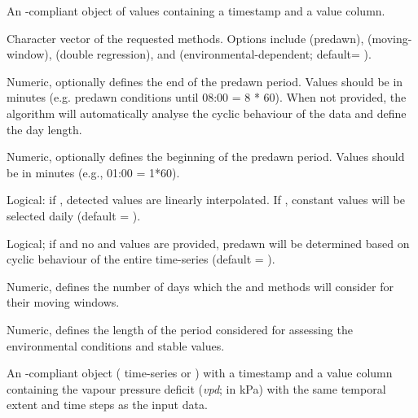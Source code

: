 \documentclass[a4paper]{book}
\begin{document}
\begin{Arguments}
\begin{ldescription}
\item[\code{input}] An -compliant object of  values containing
a timestamp and a value column.

\item[\code{methods}] Character vector of the requested  methods.
Options include  (predawn),  (moving-window),  (double regression),
and  (environmental-dependent; default= ).

\item[\code{zero.end}] Numeric, optionally defines the end of the predawn period.
Values should be in minutes (e.g. predawn conditions until 08:00 = 8 * 60).
When not provided, the algorithm will automatically analyse the cyclic behaviour
of the data and define the day length.

\item[\code{zero.start}] Numeric, optionally defines the beginning of the predawn period.
Values should be in minutes (e.g., 01:00 = 1*60).

\item[\code{interpolate}] Logical: if , detected  values are linearly
interpolated. If , constant  values will be selected daily
(default = ).

\item[\code{det.pd}] Logical; if  and no  and  values are provided,
predawn  will be determined based on cyclic behaviour of the entire
time-series (default = ).

\item[\code{max.days}] Numeric, defines the number of days which the  and 
methods will consider for their moving windows.

\item[\code{ed.window}] Numeric, defines the length of the period considered for assessing the
environmental conditions and stable  values.

\item[\code{vpd.input}] An -compliant object ( time-series or )
with a timestamp and a value column containing the vapour pressure deficit (\emph{vpd}; in kPa)
with the same temporal extent and time steps as the input data.


\end{ldescription}
\end{Arguments}
\end{document}
